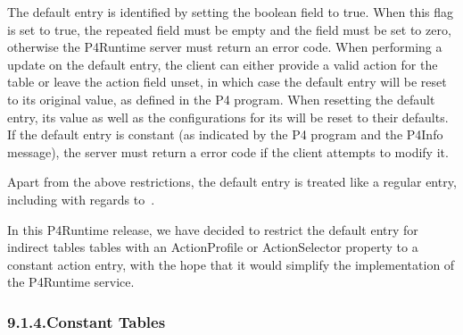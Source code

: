 \documentclass[11pt]{article}
\begin{document}
{%
The default entry is identified by setting the  boolean field
to true. When this flag is set to true, the repeated  field must be empty
and the  field must be set to zero, otherwise the P4Runtime server
must return an  error code. When performing a  update
on the default entry, the client can either provide a valid action for the table
or leave the action field unset, in which case the default entry will be reset
to its original value, as defined in the P4 program. When resetting the default
entry, its  value as well as the configurations for its
 will be reset to their defaults. If
the default entry is constant (as indicated by the P4 program and the P4Info
message), the server must return a  error code if the client
attempts to modify it.%

Apart from the above restrictions, the default entry is treated like a regular
entry, including with regards to~.%

In this P4Runtime release, we have decided to restrict the default entry for
indirect tables \textemdash{} tables with an ActionProfile or ActionSelector
 property \textemdash{} to a constant  action entry, with the
hope that it would simplify the implementation of the P4Runtime service.%

\subsubsection{9.1.4.\hspace*{0.5em}Constant Tables}\label{sec-constant-tables}%

}
\end{document}
